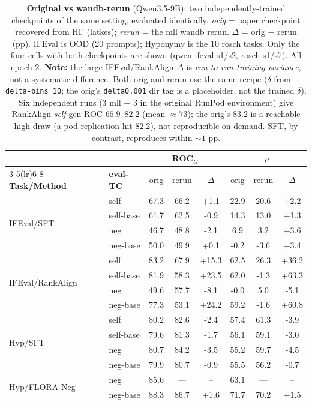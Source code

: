 \begin{table}[t]\centering\footnotesize\setlength{\tabcolsep}{5pt}
\begin{tabular}{ll cc c cc c}
\toprule
& & \multicolumn{3}{c}{\textbf{ROC$_G$}} & \multicolumn{3}{c}{\textbf{$\rho$}} \\
\cmidrule(lr){3-5}\cmidrule(lr){6-8}
\textbf{Task/Method} & \textbf{eval-TC} & orig & rerun & $\Delta$ & orig & rerun & $\Delta$ \\
\midrule
\multirow{4}{*}{IFEval/SFT} & self & 67.3 & 66.2 & +1.1 & 22.9 & 20.6 & +2.2 \\
 & self-base & 61.7 & 62.5 & -0.9 & 14.3 & 13.0 & +1.3 \\
 & neg & 46.7 & 48.8 & -2.1 & 6.9 & 3.2 & +3.6 \\
 & neg-base & 50.0 & 49.9 & +0.1 & -0.2 & -3.6 & +3.4 \\
\midrule
\multirow{4}{*}{IFEval/RankAlign} & self & 83.2 & 67.9 & +15.3 & 62.5 & 26.3 & +36.2 \\
 & self-base & 81.9 & 58.3 & +23.5 & 62.0 & -1.3 & +63.3 \\
 & neg & 49.6 & 57.7 & -8.1 & -0.0 & 5.0 & -5.1 \\
 & neg-base & 77.3 & 53.1 & +24.2 & 59.2 & -1.6 & +60.8 \\
\midrule
\multirow{4}{*}{Hyp/SFT} & self & 80.2 & 82.6 & -2.4 & 57.4 & 61.3 & -3.9 \\
 & self-base & 79.6 & 81.3 & -1.7 & 56.1 & 59.1 & -3.0 \\
 & neg & 80.7 & 84.2 & -3.5 & 55.2 & 59.7 & -4.5 \\
 & neg-base & 79.9 & 80.7 & -0.9 & 55.5 & 56.2 & -0.7 \\
\midrule
\multirow{2}{*}{Hyp/FLORA-Neg} & neg & 85.6 & --- & -- & 63.1 & --- & -- \\
 & neg-base & 88.3 & 86.7 & +1.6 & 71.7 & 70.2 & +1.5 \\
\bottomrule
\end{tabular}
\caption{\textbf{Original vs wandb-rerun} (Qwen3.5-9B): two independently-trained checkpoints of the same setting, evaluated identically. \emph{orig} = paper checkpoint recovered from HF (latkes); \emph{rerun} = the mll wandb rerun. $\Delta$ = orig $-$ rerun (pp). IFEval is OOD (20 prompts); Hyponymy is the 10 rosch tasks. Only the four cells with both checkpoints are shown (qwen ifeval s1/s2, rosch s1/s7). All epoch 2.
\textbf{Note:} the large IFEval/RankAlign $\Delta$ is \emph{run-to-run training variance}, not a systematic
difference. Both orig and rerun use the same recipe ($\delta$ from \texttt{-{}-delta-bins 10}; the orig's
\texttt{delta0.001} dir tag is a placeholder, not the trained $\delta$). Six independent runs (3 mll + 3 in the
original RunPod environment) give RankAlign \emph{self} gen ROC $65.9$--$82.2$ (mean ${\approx}73$); the orig's
$83.2$ is a reachable high draw (a pod replication hit $82.2$), not reproducible on demand. SFT, by contrast,
reproduces within ${\sim}1$ pp.}
\label{tab:orig-vs-rerun-qwen}
\end{table}

